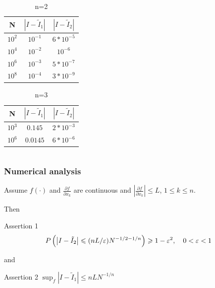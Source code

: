 \documentclass[12pt]{beamer}
\begin{document}
\begin{frame}
{\begin{columns}
\begin{column}{5cm}
\begin {table}[h]
\caption{n=2}
\begin{center}
\begin{tabular}{| c | c | c |}
\hline 
N & $|I-\tilde{I}_1 |$ &  $|I-\tilde{I}_2|$\\
\hline
$10^2$ & $10^{-1}$& $ 6*10^{-5}$\\
\hline
$10^4$ & $10^{-2}$ & $ 10^{-6}$\\
\hline
$10^6$& $10^{-3}$&$5*10^{-7}$\\
\hline
$10^8$ &$10^{-4}$&$ 3*10^{-9}$\\
\hline
\end{tabular}
\end{center}
\end{table}
\begin {table}[h]
\caption{n=3}
\begin{center}
\begin{tabular}{| c | c | c |}
\hline 
N & $|I-\tilde{I}_1 |$ &  $|I-\tilde{I}_2|$\\
\hline
$10^3$& $0.145$& $2*10^{-3}$\\
\hline
$10^6$&$0.0145$&$ 6*10^{-6}$\\
\hline
\end{tabular}
\end{center}
\end{table}
\end{column}
\end{columns}

}
\end{frame}

\begin{frame}\frametitle{Numerical analysis}
Assume $f(\cdot)$ and $\frac{\partial f}{\partial x_k}$ are continuous and 
$\left|\frac{\partial f}{\partial x_k}\right| \leqslant L$, $1 \leqslant k \leqslant n$.

Then
\begin{block}{Assertion 1}
$$P\left(\left|I-\tilde{I}_2 \right| \leqslant (nL/\varepsilon) N^{-1/2 - 1/n}\right) \geqslant 1- \varepsilon^2, \quad0 < \varepsilon < 1$$ 
\end{block}
and
\begin{block}{Assertion 2}
$\sup_{f}\left|I-\tilde{I}_1 \right| \leqslant n L N^{- 1/n}$
\end{block}
\end{frame}
\end{document}
